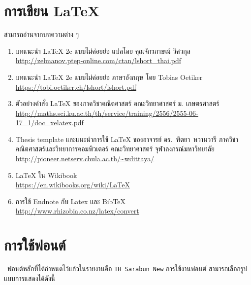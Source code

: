 \section{การเขียน LaTeX}
สามารถอ่านจากบทความต่าง ๆ
\begin{enumerate}[1.]
    \item บทแนะนำ LaTeX 2e แบบไม่ค่อยย่อ แปลโดย คุณจักรภาษณ์ วิศวกุล\\
    \url{http://zelmanov.ptep-online.com/ctan/lshort_thai.pdf}

    \item บทแนะนำ LaTeX 2e แบบไม่ค่อยย่อ ภาษาอังกฤษ โดย Tobias Oetiker\\
    \url{https://tobi.oetiker.ch/lshort/lshort.pdf}

    \item ตัวอย่างคำสั่ง LaTeX ของภาควิชาคณิตศาสตร์ คณะวิทยาศาสตร์ ม. เกษตรศาสตร์\\
    \url{http://maths.sci.ku.ac.th/th/service/training/2556/2555-06-17_1/doc_xelatex.pdf}

    \item Thesis template และแนะนำการใช้ LaTeX ของอาจารย์ \mbox{ดร. ฑิตยา หวานวารี}  ภาควิชาคณิตศาสตร์และวิทยาการคอมพิวเตอร์ คณะวิทยาศาสตร์ จุฬาลงกรณ์มหาวิทยาลัย\\
    \url{http://pioneer.netserv.chula.ac.th/~wdittaya/}

    \item LaTeX ใน Wikibook\\
    \url{https://en.wikibooks.org/wiki/LaTeX}

    \item การใช้ Endnote กับ Latex และ BibTeX\\
    \url{http://www.rhizobia.co.nz/latex/convert}
\end{enumerate}

\newpage
\section{การใช้ฟอนต์}
\
ฟอนต์หลักที่ได้กำหนดไว้แล้วในรายงานคือ \texttt{TH Sarabun New} การใช้งานฟอนต์ สามารถเลือกรูปแบบการแสดงได้ดังนี้

